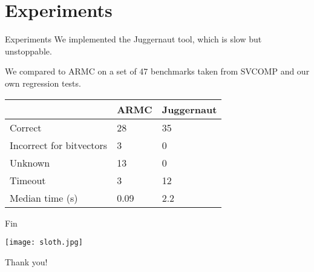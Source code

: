 \documentclass[xcolor=pdftex,t,11pt]{beamer}
\begin{document}
\section{Experiments}

\begin{frame}{Experiments}
We implemented the {\sc Juggernaut} tool, which is slow but unstoppable.

\vspace{1em}

We compared to {\sc ARMC} on a set of 47 benchmarks taken from SVCOMP and our own
regression tests.

\begin{center}
 \begin{tabular}{|l||l|l|}
  \hline
  & {\sc ARMC} & {\sc Juggernaut} \\
  \hline
  \hline
  Correct & 28 & 35 \\
  Incorrect for bitvectors & 3 & 0 \\
  Unknown & 13 & 0 \\
  Timeout & 3 & 12 \\
  \hline
  Median time (s) & 0.09 & 2.2 \\
  \hline
 \end{tabular}
\end{center}
 
\end{frame}


\begin{frame}[fragile]{Fin}

\begin{center}
\texttt{[image: sloth.jpg]}

\Huge
 Thank you!
\end{center}

\end{frame}
\end{document}

